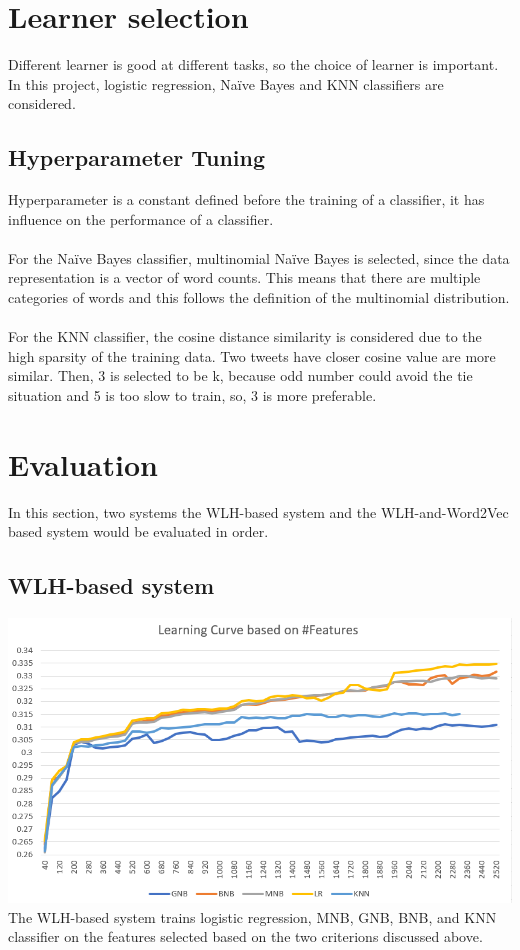 \documentclass[11pt]{article}
\begin{document}
\section{Learner selection} 
Different learner is good at different tasks, so the choice of learner is important. In this project, logistic regression, Naïve Bayes and KNN classifiers  are considered.\\
\subsection{Hyperparameter Tuning}
Hyperparameter is a constant defined before the training of a classifier, it has influence on the performance of a classifier.\\\\
For the Naïve Bayes classifier, multinomial Naïve Bayes is selected, since the data representation is a vector of word counts. This means that there are multiple categories of words and this follows the definition of the multinomial distribution.\\\\
For the KNN classifier, the cosine distance similarity is considered due to the high sparsity of the training data. Two tweets have closer cosine value are more similar. Then, 3 is selected to be k, because odd number could avoid the tie situation and 5 is too slow to train, so, 3 is more preferable.
\section{Evaluation}
In this section, two systems the WLH-based system and the WLH-and-Word2Vec based system would be evaluated in order.
\subsection{WLH-based system}
\includegraphics[scale=0.48 	]{learningCurve}
The WLH-based system trains logistic regression, MNB, GNB, BNB, and KNN classifier on the features selected based on the two criterions discussed above.
\end{document}
